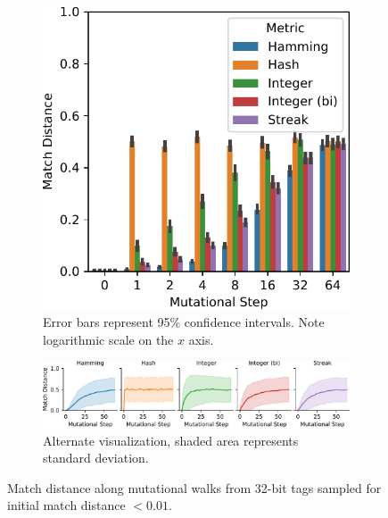 \begin{figure}[!htbp]
\begin{center}

\begin{subfigure}{\textwidth}
\includegraphics[width=\textwidth]{img/mutational_walk_sampled_start/bitweight=0dot5+seed=1+title=mutational_walk_barplot+_data_hathash_hash=05b961e08b5b7854+_script_fullcat_hash=982405ca713eba73+ext=}
\caption{
Error bars represent 95\% confidence intervals.
Note logarithmic scale on the $x$ axis.
}
\label{fig:mutational_walk_sampled_start_barplot}
\end{subfigure}

\begin{subfigure}{\textwidth}
\includegraphics[width=\textwidth]{img/mutational_walk_sampled_start/bitweight=0dot5+seed=1+title=mutational_walk_lineplot+_data_hathash_hash=05b961e08b5b7854+_script_fullcat_hash=982405ca713eba73+ext=.pdf}
\caption{
Alternate visualization, shaded area represents standard deviation.
}
\end{subfigure}

\caption{
Match distance along mutational walks from 32-bit tags sampled for initial match distance $<0.01$.
}
\label{fig:mutational_walk_sampled_start}

\end{center}
\end{figure}
